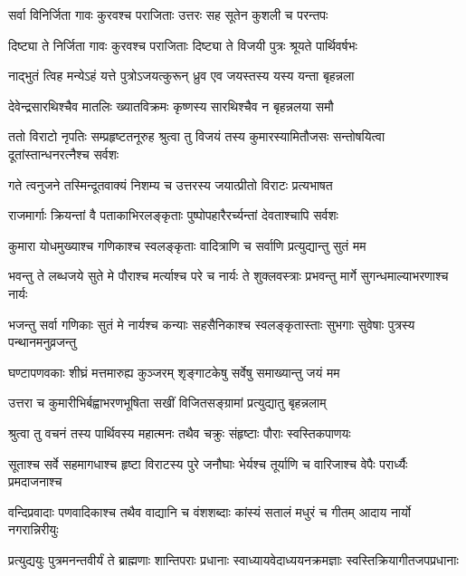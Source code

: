 \twolineshloka
{सर्वा विनिर्जिता गावः कुरवश्च पराजिताः}
{उत्तरः सह सूतेन कुशली च परन्तपः}




\twolineshloka
{दिष्ट्या ते निर्जिता गावः कुरवश्च पराजिताः}
{दिष्ट्या ते विजयी पुत्रः श्रूयते पार्थिवर्षभः}


\twolineshloka
{नाद्भुतं त्विह मन्येऽहं यत्ते पुत्रोऽजयत्कुरून्}
{ध्रुव एव जयस्तस्य यस्य यन्ता बृहन्नला}


\twolineshloka
{देवेन्द्रसारथिश्चैव मातलिः ख्यातविक्रमः}
{कृष्णस्य सारथिश्चैव न बृहन्नलया समौ}



\threelineshloka
{ततो विराटो नृपतिः सम्प्रहृष्टतनूरुह}
{श्रुत्वा तु विजयं तस्य कुमारस्यामितौजसः}
{सन्तोषयित्वा दूतांस्तान्धनरत्नैश्च सर्वशः}


\twolineshloka
{गते त्वनुजने तस्मिन्दूतवाक्यं निशम्य च}
{उत्तरस्य जयात्प्रीतो विराटः प्रत्यभाषत}


\twolineshloka
{राजमार्गाः क्रियन्तां वै पताकाभिरलङ्कृताः}
{पुष्पोपहारैरर्च्यन्तां देवताश्चापि सर्वशः}


\twolineshloka
{कुमारा योधमुख्याश्च गणिकाश्च स्वलङ्कृताः}
{वादित्राणि च सर्वाणि प्रत्युद्यान्तु सुतं मम}


\fourlineindentedshloka
{भवन्तु ते लब्धजये सुते मे}
{पौराश्च मर्त्याश्च परे च नार्यः}
{ते शुक्लवस्त्राः प्रभवन्तु मार्गे}
{सुगन्धमाल्याभरणाश्च नार्यः}


\fourlineindentedshloka
{भजन्तु सर्वा गणिकाः सुतं मे}
{नार्यश्च कन्याः सहसैनिकाश्च}
{स्वलङ्कृतास्ताः सुभगाः सुवेषाः}
{पुत्रस्य पन्थानमनुव्रजन्तु}


\twolineshloka
{घण्टापणवकाः शीघ्रं मत्तमारुह्य कुञ्जरम्}
{शृङ्गाटकेषु सर्वेषु समाख्यान्तु जयं मम}


\twolineshloka
{उत्तरा च कुमारीभिर्बह्वाभरणभूषिता}
{सखीं विजितसङ्ग्रामां प्रत्युद्यातु बृहन्नलाम्}


\twolineshloka
{श्रुत्वा तु वचनं तस्य पार्थिवस्य महात्मनः}
{तथैव चक्रुः संहृष्टाः पौराः स्वस्तिकपाणयः}


\fourlineindentedshloka
{सूताश्च सर्वे सहमागधाश्च}
{हृष्टा विराटस्य पुरे जनौघाः}
{भेर्यश्च तूर्याणि च वारिजाश्च}
{वेपैः परार्ध्यैः प्रमदाजनाश्च}


\fourlineindentedshloka
{वन्दिप्रवादाः पणवादिकाश्च}
{तथैव वाद्यानि च वंशशब्दाः}
{कांस्यं सतालं मधुरं च गीतम्}
{आदाय नार्यो नगरान्निरीयुः}


\fourlineindentedshloka
{प्रत्युद्ययुः पुत्रमनन्तवीर्यं}
{ते ब्राह्मणाः शान्तिपराः प्रधानाः}
{स्वाध्यायवेदाध्ययनक्रमज्ञाः}
{स्वस्तिक्रियागीतजपप्रधानाः}

